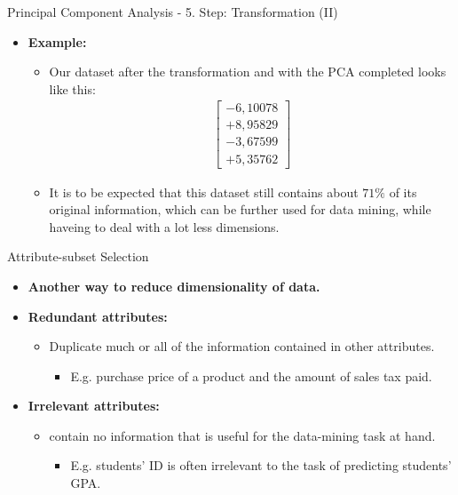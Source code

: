 \begin{frame}{Principal Component Analysis - 5. Step: Transformation (II)}
	\begin{itemize}
		\item \textbf{Example:}
		\begin{itemize}
			\item Our dataset after the transformation and with the PCA 
			completed looks like this: \\
			\begin{align}
				\begin{bmatrix} -6,10078 \\ +8,95829 \\ -3,67599 \\ +5,35762 
				\end{bmatrix}
			\end{align}
			\item It is to be expected that this dataset still contains about 
			$71\%$ of its original information, which can be further used for 
			data mining, while haveing to deal with a lot less dimensions.
		\end{itemize}
	\end{itemize}
\end{frame}

\begin{frame}{Attribute-subset Selection}
	\begin{itemize}
		\item \textbf{Another way to reduce dimensionality of data.}
		\item\textbf{\color{airforceblue}Redundant attributes:}
		\begin{itemize}
			\item Duplicate much or all of the information contained in other 
			attributes.
			\begin{itemize}
				\item E.g. purchase price of a product and the amount of sales 
				tax paid.
			\end{itemize}
		\end{itemize}
		\item \textbf{\color{airforceblue}Irrelevant attributes:}
		\begin{itemize}
			\item contain no information that is useful for the data-mining 
			task at hand.
			\begin{itemize}
				\item E.g. students' ID is often irrelevant to the task of 
				predicting students' GPA.
			\end{itemize}
		\end{itemize}
	\end{itemize}
\end{frame}

